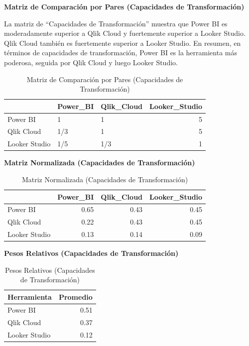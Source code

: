 \documentclass[
  11pt,
  bookmarksnumbered]{article}
\begin{document}
\newpage

\textbf{Matriz de Comparación por Pares (Capacidades de Transformación)}

La matriz de ``Capacidades de Transformación'' muestra que Power BI es moderadamente superior a Qlik Cloud y fuertemente superior a Looker Studio. Qlik Cloud también es fuertemente superior a Looker Studio. En resumen, en términos de capacidades de transformación, Power BI es la herramienta más poderosa, seguida por Qlik Cloud y luego Looker Studio.

\begin{table}[H]

\caption{\label{tab:unnamed-chunk-33}Matriz de Comparación por Pares (Capacidades de Transformación)}
\centering
\fontsize{12}{14}\selectfont
\begin{tabular}[t]{l|l|l|r}
\hline
  & Power\_BI & Qlik\_Cloud & Looker\_Studio\\
\hline
Power BI & 1 & 1 & 5\\
\hline
Qlik Cloud & 1/3 & 1 & 5\\
\hline
Looker Studio & 1/5 & 1/3 & 1\\
\hline
\end{tabular}
\end{table}

\textbf{Matriz Normalizada (Capacidades de Transformación)}

\begin{table}[H]

\caption{\label{tab:unnamed-chunk-34}Matriz Normalizada (Capacidades de Transformación)}
\centering
\fontsize{12}{14}\selectfont
\begin{tabular}[t]{l|r|r|r}
\hline
  & Power\_BI & Qlik\_Cloud & Looker\_Studio\\
\hline
Power BI & 0.65 & 0.43 & 0.45\\
\hline
Qlik Cloud & 0.22 & 0.43 & 0.45\\
\hline
Looker Studio & 0.13 & 0.14 & 0.09\\
\hline
\end{tabular}
\end{table}

\textbf{Pesos Relativos (Capacidades de Transformación)}

\begin{table}[H]

\caption{\label{tab:unnamed-chunk-35}Pesos Relativos (Capacidades de Transformación)}
\centering
\fontsize{12}{14}\selectfont
\begin{tabular}[t]{l|r}
\hline
Herramienta & Promedio\\
\hline
Power BI & 0.51\\
\hline
Qlik Cloud & 0.37\\
\hline
Looker Studio & 0.12\\
\hline
\end{tabular}
\end{table}
\end{document}
